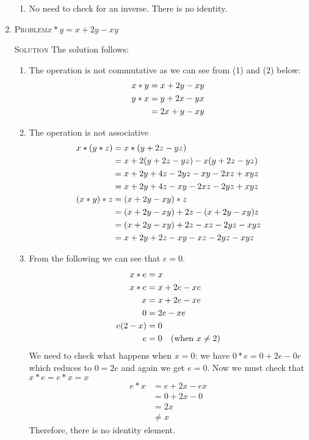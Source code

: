 \documentclass{amsart}
\newcommand{\Solution}{\textsc{Solution}\xspace}
\newcommand{\Problem}{\textsc{Problem}\xspace}
\begin{document}
\begin{enumerate}
\begin{enumerate}
      \item No need to check for an inverse. There is no identity.
   \end{enumerate}

   \item \Problem $x * y = x + 2y - xy$

   \noindent \Solution The solution follows:

   \begin{enumerate}
      
      \item The operation is not commutative as we can see from
            (1) and (2) below:
      \begin{align*}
         x * y & = x + 2y - xy \\
	 y * x & = y + 2x - yx \\
	       & = 2x + y - xy \notag
      \end{align*}


      \item The operation is not associative
      \begin{align*}
         x * (y * z) & = x * (y + 2z - yz)                          \\
	             & = x + 2(y + 2z - yz) - x(y + 2z - yz) \notag \\
		     & = x + 2y + 4z - 2yz - xy - 2xz + xyz  \notag \\
		     & = x + 2y + 4z - xy - 2xz - 2yz + xyz  \notag \\
	 (x * y) * z & = (x + 2y - xy) * z                          \\
	             & = (x + 2y - xy) + 2z - (x + 2y - xy)z \notag \\
		     & = (x + 2y - xy) + 2z - xz - 2yz - xyz \notag \\
		     & = x + 2y + 2z - xy - xz - 2yz - xyz   \notag
      \end{align*}

      \item From the following we can see that $e=0$. 
      \begin{align*}
         x * e & = x                  \\
	 x * e & = x + 2e - xe        \\
	     x & = x + 2e - xe \notag \\
	     0 & =     2e - xe \notag \\
	e(2-x) & = 0           \notag \\
	     e & = 0 \quad\text{(when $x \ne 2$)} \notag 
      \end{align*}
      We need to check what happens when $x = 0$: we have 
      $0*e=0+2e-0e$ which reduces to $0 = 2e$ and again we get $e = 0$.
      Now we must check that $x*e=e*x=x$
      \begin{align*}
         e * x & = e + 2x - ex      \\
	       & = 0 + 2x - 0       \\
	       & = 2x               \\
	       & \ne x              
      \end{align*}
      Therefore, there is no identity element.


\end{enumerate}
\end{enumerate}
\end{document}
